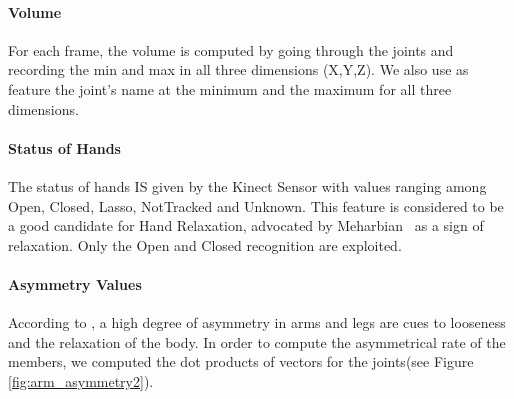 \documentclass[a4paper,twocolumn]{svjour3}
\begin{document}
\paragraph{Volume}
For each frame, the volume is computed by going through the joints and recording the min and max in all three dimensions (X,Y,Z). 
We also use as feature the joint's name at the minimum and the maximum for all three dimensions.

\paragraph{Status of Hands}
The status of hands IS given by the Kinect Sensor with values ranging among Open, Closed, Lasso, NotTracked and Unknown. 
This feature is considered to be a good candidate for Hand Relaxation, advocated by Meharbian~\cite{Meharbian} as a sign of relaxation. 
Only the Open and Closed recognition are exploited. 


\paragraph{Asymmetry Values}
According to \cite{Mehrabian}, a high degree of asymmetry in arms and legs are cues to looseness and the relaxation of the body.
In order to compute the asymmetrical rate of the members, we computed the dot products of vectors for the joints(see Figure \ref{fig:arm_asymmetry2}). 

\end{document}
